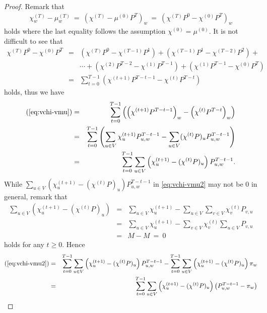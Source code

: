 \documentclass[letter, 11pt]{article}
\newcommand{\1}{\mbox{1}\hspace{-0.25em}\mbox{l}}
\begin{document}
\begin{proof}
Remark that
\begin{eqnarray}
\chi_w^{(T)} - \mu_w^{(T)}
 \ =\ \left( \chi^{(T)}-\mu^{(0)}  P^T \right)_w
 \ =\ \left(\chi^{(T)} P^0-\chi^{(0)} P^T \right)_w
\label{eq:vchi-vmu}
\end{eqnarray}
 holds where the last equality follows the assumption $\chi^{(0)}=\mu^{(0)}$. 
It is not difficult to see that 
\begin{eqnarray*}
\chi^{(T)} P^0-\chi^{(0)} P^T
&=& \left(\chi^{(T)} P^0  -\chi^{(T-1)} P^{1}\right)
   +\left(\chi^{(T-1)} P^1  -\chi^{(T-2)} P^{2}  \right)+ \nonumber\\
&&\cdots +\left(\chi^{(2)} P^{T-2}  -\chi^{(1)} P^{T-1}  \right)
  +\left(\chi^{(1)} P^{T-1}  -\chi^{(0)} P^{T} \right)\nonumber\\
&=& \sum_{t=0}^{T-1}\left( \chi^{(t+1)} P^{T-t-1} - \chi^{(t)} P^{T-t} \right)
\end{eqnarray*}
holds, thus we have
\begin{eqnarray}
 (\ref{eq:vchi-vmu})
&=& \sum_{t=0}^{T-1}\left(\left( \chi^{(t+1)} P^{T-t-1}\right)_w -\left( \chi^{(t)} P^{T-t} \right)_w\right) \nonumber\\
&=& \sum_{t=0}^{T-1}\left(\sum_{u\in V}\chi_u^{(t+1)} P^{T-t-1}_{u, w} -\sum_{u\in V}( \chi^{(t)} P)_u  P^{T-t-1}_{u, w}\right) \nonumber\\
&=& \sum_{t=0}^{T-1}\sum_{u\in V} \left( \chi_u^{(t+1) }-( \chi^{(t)} P)_u\right)  P^{T-t-1}_{u, w}.  
\label{eq:vchi-vmu2}
\end{eqnarray}
 While 
  $\sum_{u\in V} \left( \chi_u^{(t+1) }-( \chi^{(t)} P)_u\right)  P^{T-t-1}_{u, w}$ 
   in \eqref{eq:vchi-vmu2} 
   may not be $0$ in general, 
  remark that 
\begin{eqnarray*}
 \sum_{u\in V} \left( \chi_u^{(t+1) }-( \chi^{(t)} P)_u\right)
&=&\sum_{u\in V} \chi_u^{(t+1)}- \sum_{u\in V}\sum_{v\in V} \chi^{(t)}_v P_{v, u} \\
&=&\sum_{u\in V} \chi_u^{(t+1)}- \sum_{v\in V} \chi^{(t)}_v \sum_{u\in V} P_{v, u} \\
&=& M-M 
\ =\ 0
\end{eqnarray*}
 holds for any $t \geq 0$. 
Hence
\begin{eqnarray}
(\ref{eq:vchi-vmu2})
 &=& \sum_{t=0}^{T-1}\sum_{u\in V} \left( \chi_u^{(t+1) }-( \chi^{(t)} P)_u\right)P^{T-t-1}_{u, w}
    -\sum_{t=0}^{T-1}\sum_{u\in V} \left( \chi_u^{(t+1) }-( \chi^{(t)} P)_u\right)\pi_w\nonumber\\
 &=& \sum_{t=0}^{T-1}\sum_{u\in V}\left(\chi_u^{(t+1)}-(\chi^{(t)}P)_u\right) \left( P^{T-t-1}_{u, w}-\pi_w \right) 

\end{eqnarray}
\end{proof}
\end{document}
